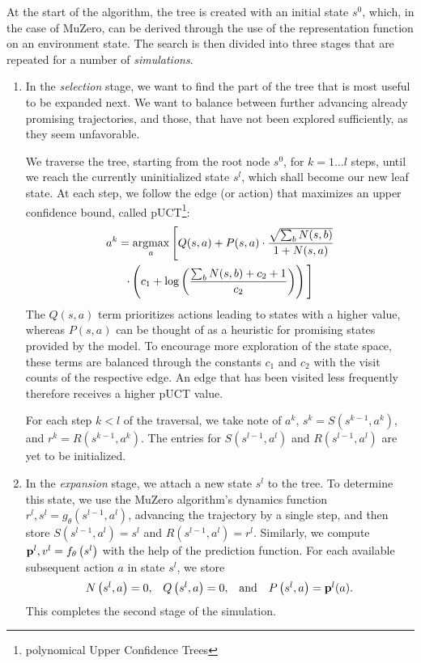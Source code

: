 At the start of the algorithm, the tree is created with an initial state $s^0$, which, in the case of MuZero, can be derived through the use of the representation function on an environment state. The search is then divided into three stages that are repeated for a number of \textit{simulations}.
\begin{enumerate}
    \item In the \textit{selection} stage, we want to find the part of the tree that is most useful to be expanded next. We want to balance between further advancing already promising trajectories, and those, that have not been explored sufficiently, as they seem unfavorable.

    We traverse the tree, starting from the root node $s^0$, for $k=1 \dots l$ steps, until we reach the currently uninitialized state $s^l$, which shall become our new leaf state. At each step, we follow the edge (or action) that maximizes an upper confidence bound, called pUCT\footnote{polynomical Upper Confidence Trees}:
    \begin{multline*}
        a^k = \argmax_a \Bigg[
            Q(s, a) +
            P(s, a) \cdot
            \frac{\sqrt{\sum_b N(s,b)}}{1 + N(s, a)} \\
            \cdot \left(
                c_1 + \log \left(
                    \frac{\sum_b N(s, b) + c_2 + 1}{c_2}
                \right)
            \right)
        \Bigg]
    \end{multline*}
    The $Q(s, a)$ term prioritizes actions leading to states with a higher value, whereas $P(s, a)$ can be thought of as a heuristic for promising states provided by the model. To encourage more exploration of the state space, these terms are balanced through the constants $c_1$ and $c_2$ with the visit counts of the respective edge. An edge that has been visited less frequently therefore receives a higher pUCT value.

    For each step $k < l$ of the traversal, we take note of $a^k$, $s^k = S \left(s^{k-1}, a^k \right)$, and $r^k = R \left(s^{k-1}, a^k \right)$. The entries for $S \left(s^{l-1}, a^l \right)$ and $R \left(s^{l-1}, a^l \right)$ are yet to be initialized.

    \item In the \textit{expansion} stage, we attach a new state $s^l$ to the tree. To determine this state, we use the MuZero algorithm's dynamics function $r^l, s^l = g_\theta \left(s^{l-1}, a^l\right)$, advancing the trajectory by a single step, and then store $S \left( s^{l-1}, a^l\right) = s^l$ and $R \left(s^{l-1}, a^l \right) = r^l$. Similarly, we compute $\text{\textbf{p}}^l, v^l = f_\theta \left(s^l\right)$ with the help of the prediction function. For each available subsequent action $a$ in state $s^l$, we store
    \begin{equation*}
        \begin{array}{cccc}
            N \left(s^l, a \right) = 0, &
            Q \left(s^l, a \right) = 0, &
            \text{and} &
            P \left(s^l, a \right) = \text{\textbf{p}}^l(a).
        \end{array}
    \end{equation*}
    This completes the second stage of the simulation.


\end{enumerate}
